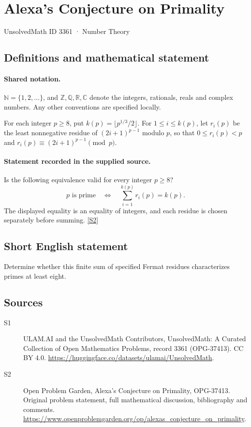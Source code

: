\documentclass[11pt]{article}
\newcommand{\sref}[2]{\hyperlink{source:#1:#2}{[S#2]}}
\begin{document}
\setcounter{section}{3360}
\section{Alexa's Conjecture on Primality}\label{3361}
{\small\sffamily UnsolvedMath ID 3361 · Number Theory}
\subsection{Definitions and mathematical statement}

\paragraph{Shared notation.}$\mathbb N=\{1,2,\ldots\}$, and $\mathbb Z,\mathbb Q,\mathbb R,\mathbb C$ denote the integers, rationals, reals and complex numbers. Any other conventions are specified locally.


For each integer $p\ge8$, put $k(p)=\lfloor p^{1/3}/2\rfloor$. For $1\le i\le k(p)$, let $r_i(p)$ be the least nonnegative residue of $(2i+1)^{p-1}$ modulo $p$, so that $0\le r_i(p)<p$ and $r_i(p)\equiv(2i+1)^{p-1}\pmod p$.
\paragraph{Statement recorded in the supplied source.}
Is the following equivalence valid for every integer $p\ge8$?
\[
 p\text{ is prime}\quad\Longleftrightarrow\quad
 \sum_{i=1}^{k(p)}r_i(p)=k(p).
\]
The displayed equality is an equality of integers, and each residue is chosen separately before summing. \sref{3361}{2}
\subsection{Short English statement}
Determine whether this finite sum of specified Fermat residues characterizes primes at least eight.
\subsection{Sources}
\begin{description}
\item[\hypertarget{source:3361:1}{S1}] ULAM.AI and the UnsolvedMath Contributors, UnsolvedMath: A Curated Collection of Open Mathematics Problems, record 3361 (OPG-37413). CC BY 4.0. \url{https://huggingface.co/datasets/ulamai/UnsolvedMath}.
\item[\hypertarget{source:3361:2}{S2}] Open Problem Garden, Alexa's Conjecture on Primality, OPG-37413. Original problem statement, full mathematical discussion, bibliography and comments. \url{https://www.openproblemgarden.org/op/alexas_conjecture_on_primality}.
\end{description}
\label{end:3361}
\end{document}
